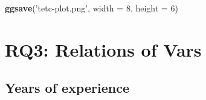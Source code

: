 \documentclass[]{article}
\newenvironment{Shaded}{\begin{snugshade}}{\end{snugshade}}
\newcommand{\KeywordTok}[1]{\textcolor[rgb]{0.13,0.29,0.53}{\textbf{#1}}}
\newcommand{\DataTypeTok}[1]{\textcolor[rgb]{0.13,0.29,0.53}{#1}}
\newcommand{\DecValTok}[1]{\textcolor[rgb]{0.00,0.00,0.81}{#1}}
\newcommand{\StringTok}[1]{\textcolor[rgb]{0.31,0.60,0.02}{#1}}
\newcommand{\NormalTok}[1]{#1}
\begin{document}
\begin{Shaded}
\begin{Highlighting}[]
\KeywordTok{ggsave}\NormalTok{(}\StringTok{'tetc-plot.png'}\NormalTok{, }\DataTypeTok{width =} \DecValTok{8}\NormalTok{, }\DataTypeTok{height =} \DecValTok{6}\NormalTok{)}
\end{Highlighting}
\end{Shaded}

\section{RQ3: Relations of Vars}\label{rq3-relations-of-vars}

\subsection{Years of experience}\label{years-of-experience}
\end{document}
